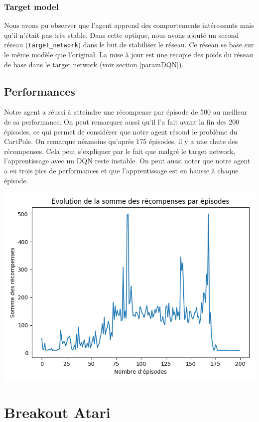 \documentclass[10pt,a4paper]{article}
\begin{document}
\subsubsection{Target model} \label{targetmodelDQN}

Nous avons pu observer que l'agent apprend des comportements intéressants mais qu'il n'était pas très stable. Dans cette optique, nous avons ajouté un second réseau (\lstinline{target_network}) dans le but de stabiliser le réseau. Ce réseau se base sur le même modèle que l'original. La mise à jour est une recopie des poids du réseau de base dans le target network (voir section \ref{paramDQN}).

\subsection{Performances}

Notre agent a réussi à atteindre une récompense par épisode de 500 au meilleur de sa performance. On peut remarquer aussi qu'il l'a fait avant la fin des 200 épisodes, ce qui permet de considérer que notre agent résoud le problème du CartPole. On remarque néamoins qu'après 175 épisodes, il y a une chute des récompenses. Cela peut s'expliquer par le fait que malgré le target network, l'apprentissage avec un DQN reste instable. On peut aussi noter que notre agent a eu trois pics de performances et que l'apprentissage est en hausse à chaque épisode.

\includegraphics[scale=0.5]{evolution_recompenses_dqn_cartpole.png}

\section{Breakout Atari}
\end{document}
